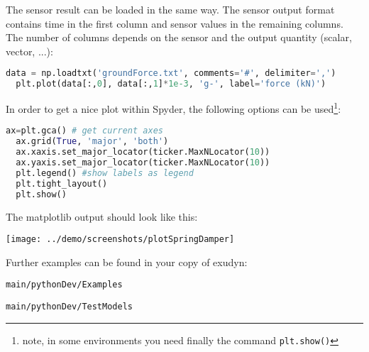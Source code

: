 The sensor result can be loaded in the same way. The sensor output format contains time in the first column and sensor values in the remaining columns. The number of columns depends on the 
sensor and the output quantity (scalar, vector, ...):
\begin{lstlisting}[language=Python, firstnumber=75]
  data = np.loadtxt('groundForce.txt', comments='#', delimiter=',')
  plt.plot(data[:,0], data[:,1]*1e-3, 'g-', label='force (kN)')
\end{lstlisting}
%
In order to get a nice plot within Spyder, the following options can be used\footnote{note, in some environments you need finally the command \texttt{plt.show()}}:
\begin{lstlisting}[language=Python, firstnumber=77]
  ax=plt.gca() # get current axes
  ax.grid(True, 'major', 'both')
  ax.xaxis.set_major_locator(ticker.MaxNLocator(10))
  ax.yaxis.set_major_locator(ticker.MaxNLocator(10))
  plt.legend() #show labels as legend
  plt.tight_layout()
  plt.show() 
\end{lstlisting}
%
The matplotlib output should look like this:
\begin{center}
  \texttt{[image: ../demo/screenshots/plotSpringDamper]}
\end{center}
%
\vspace{24pt}
Further examples can be found in your copy of exudyn: 
\bi
  \item[] \texttt{main/pythonDev/Examples}
  \item[] \texttt{main/pythonDev/TestModels}
\ei


